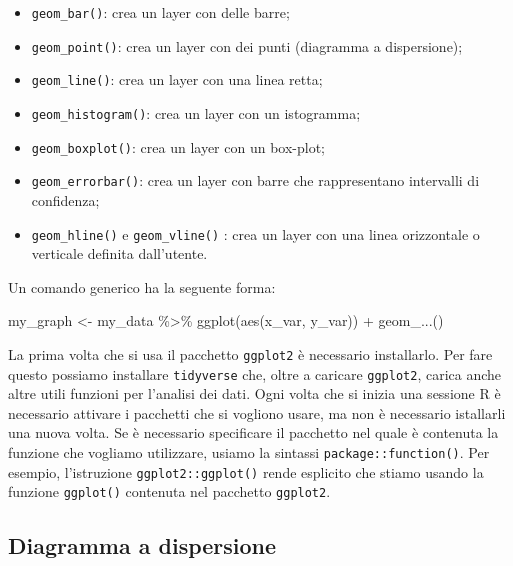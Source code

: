 \documentclass[
  10pt,
  italian,
  a4paper,
  extrafontsizes,onecolumn,openright
  ]{memoir}
\newenvironment{Shaded}{\begin{snugshade}}{\end{snugshade}}
\newcommand{\FunctionTok}[1]{\textcolor[rgb]{0.00,0.00,0.00}{#1}}
\newcommand{\NormalTok}[1]{#1}
\newcommand{\OtherTok}[1]{\textcolor[rgb]{0.56,0.35,0.01}{#1}}
\newcommand{\SpecialCharTok}[1]{\textcolor[rgb]{0.00,0.00,0.00}{#1}}
\begin{document}
\begin{itemize}
\item
  \texttt{geom\_bar()}: crea un layer con delle barre;
\item
  \texttt{geom\_point()}: crea un layer con dei punti (diagramma a dispersione);
\item
  \texttt{geom\_line()}: crea un layer con una linea retta;
\item
  \texttt{geom\_histogram()}: crea un layer con un istogramma;
\item
  \texttt{geom\_boxplot()}: crea un layer con un box-plot;
\item
  \texttt{geom\_errorbar()}: crea un layer con barre che rappresentano intervalli di confidenza;
\item
  \texttt{geom\_hline()} e \texttt{geom\_vline()} : crea un layer con una linea orizzontale o verticale definita dall'utente.
\end{itemize}

Un comando generico ha la seguente forma:

\begin{Shaded}
\begin{Highlighting}[]
\NormalTok{my\_graph }\OtherTok{\textless{}{-}}\NormalTok{ my\_data }\SpecialCharTok{\%\textgreater{}\%} 
  \FunctionTok{ggplot}\NormalTok{(}\FunctionTok{aes}\NormalTok{(x\_var, y\_var)) }\SpecialCharTok{+}
  \FunctionTok{geom\_...}\NormalTok{()}
\end{Highlighting}
\end{Shaded}

La prima volta che si usa il pacchetto \texttt{ggplot2} è necessario installarlo. Per fare questo possiamo installare \texttt{tidyverse} che, oltre a caricare \texttt{ggplot2}, carica anche altre utili funzioni per l'analisi dei dati. Ogni volta che si inizia una sessione R è necessario attivare i pacchetti che si vogliono usare, ma non è necessario istallarli una nuova volta. Se è necessario specificare il pacchetto nel quale è contenuta la funzione che vogliamo utilizzare, usiamo la sintassi \texttt{package::function()}. Per esempio, l'istruzione \texttt{ggplot2::ggplot()} rende esplicito che stiamo usando la funzione \texttt{ggplot()} contenuta nel pacchetto \texttt{ggplot2}.

\hypertarget{diagramma-a-dispersione}{%
\subsection{Diagramma a dispersione}\label{diagramma-a-dispersione}}
\end{document}
